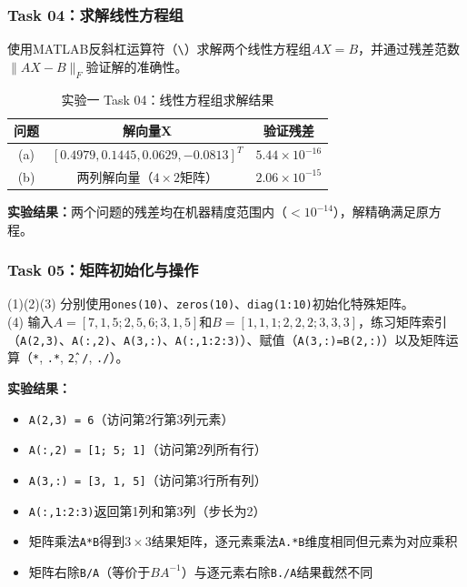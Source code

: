 \documentclass{../common/SCNU_Experimental_Report}
\begin{document}
\subsubsection{Task 04：求解线性方程组}
使用MATLAB反斜杠运算符（\texttt{\textbackslash}）求解两个线性方程组$AX = B$，并通过残差范数$\|AX - B\|_F$验证解的准确性。

\begin{table}[H]
    \centering
    \caption{实验一 Task 04：线性方程组求解结果}
    \label{tab:ex1_task4}
    \small
    \begin{tabular}{ccc}
        \toprule
        问题 & 解向量X & 验证残差 \\
        \midrule
        (a) & $[0.4979, 0.1445, 0.0629, -0.0813]^T$ & $5.44\times10^{-16}$ \\
        (b) & 两列解向量（$4\times2$矩阵） & $2.06\times10^{-15}$ \\
        \bottomrule
    \end{tabular}
\end{table}

\textbf{实验结果：}两个问题的残差均在机器精度范围内（$< 10^{-14}$），解精确满足原方程。

\subsubsection{Task 05：矩阵初始化与操作}
(1)(2)(3) 分别使用\texttt{ones(10)}、\texttt{zeros(10)}、\texttt{diag(1:10)}初始化特殊矩阵。\\
(4) 输入$A=[7,1,5; 2,5,6; 3,1,5]$和$B=[1,1,1; 2,2,2; 3,3,3]$，练习矩阵索引（\texttt{A(2,3)}、\texttt{A(:,2)}、\texttt{A(3,:)}、\texttt{A(:,1:2:3)}）、赋值（\texttt{A(3,:)=B(2,:)}）以及矩阵运算（\texttt{*}, \texttt{.*}, \texttt{\^2}, \texttt{/}, \texttt{./}）。

\textbf{实验结果：}
\begin{itemize}
    \item \texttt{A(2,3) = 6}（访问第2行第3列元素）
    \item \texttt{A(:,2) = [1; 5; 1]}（访问第2列所有行）
    \item \texttt{A(3,:) = [3, 1, 5]}（访问第3行所有列）
    \item \texttt{A(:,1:2:3)}返回第1列和第3列（步长为2）
    \item 矩阵乘法\texttt{A*B}得到$3\times3$结果矩阵，逐元素乘法\texttt{A.*B}维度相同但元素为对应乘积
    \item 矩阵右除\texttt{B/A}（等价于$BA^{-1}$）与逐元素右除\texttt{B./A}结果截然不同
\end{itemize}
\end{document}
